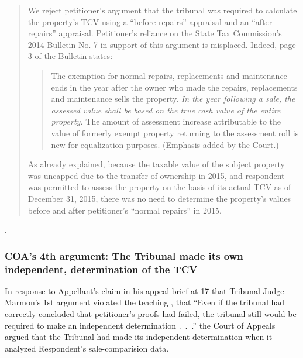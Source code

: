 \documentclass[12pt,\documentclassflag]{michiganCourtOfAppealsBrief}
\begin{document}
\begin{quotation}
We reject petitioner's argument that the tribunal was required to calculate the property's
TCV using a ``before repairs'' appraisal and an ``after repairs'' appraisal. Petitioner's reliance on
the State Tax Commission's 2014 Bulletin No. 7 in support of this argument is misplaced. Indeed,
page 3 of the Bulletin states:

\begin{quote}
  The exemption for normal repairs, replacements and maintenance ends in
the year after the owner who made the repairs, replacements and maintenance sells
the property. \emph{In the year following a sale, the assessed value shall be based on the
true cash value of the entire property.} The amount of assessment increase
attributable to the value of formerly exempt property returning to the assessment
roll is new for equalization purposes. (Emphasis added by the Court.)
\end{quote}

As already explained, because the taxable value of the subject property was uncapped due to the
transfer of ownership in 2015, and respondent was permitted to assess the property on the basis of
its actual TCV as of December 31, 2015, there was no need to determine the property's values
before and after petitioner's ``normal repairs'' in 2015.
\end{quotation}
.


\subsubsection{COA's 4th argument: The Tribunal made its own independent, determination of the TCV}

In response to Appellant's claim in his appeal brief at 17 that Tribunal Judge Marmon's 1st argument violated the teaching , that  ``Even if the tribunal had correctly concluded that petitioner's proofs had failed, the tribunal still would be required to make an independent determination .~.~.'' the Court of Appeals argued that the Tribunal had made its independent determination when it analyzed Respondent's sale-comparision data.
\end{document}
